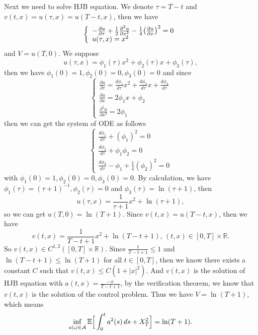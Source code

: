 \documentclass[12pt,a4paper]{ctexart}
\begin{document}
Next we need to solve HJB equation. We denote $\tau = T -t$ and $v(t, x) = u(\tau, x) = u(T - t, x)$, then we have
\begin{equation*}
\left\{
             \begin{array}{l}
             - \frac{\partial u}{\partial \tau} + \frac{1}{2} \frac{\partial^{2} u}{\partial x^{2}} - \frac{1}{4} \big{(} \frac{\partial u}{\partial x}\big{)}^{2} = 0 \\
             u(\tau, x) = x^{2}
             \end{array}
\right.
\end{equation*}
and $V = u(T, 0)$. We suppose
\begin{equation*}
    u(\tau, x) = \phi_{1} (\tau) x^{2} +  \phi_{2} (\tau) x + \phi_{3} (\tau),
\end{equation*}
then we have $\phi_{1} (0) = 1, \phi_{2} (0) = 0, \phi_{3} (0) = 0$ and since 
\begin{equation*}
\left\{
    \begin{array}{l}
        \frac{\partial u}{\partial \tau} = \frac{d \phi_{1}}{d \tau} x^{2} + \frac{d \phi_{2}}{d \tau} x + \frac{d \phi_{3}}{d \tau} \\
        \frac{\partial u}{\partial x} = 2 \phi_{1} x + \phi_{2} \\
        \frac{\partial^{2} u}{\partial x^{2}} = 2 \phi_{1}
    \end{array}
\right.
\end{equation*}
then we can get the system of ODE as follows
\begin{equation*}
\left\{
    \begin{array}{l}
        \frac{d \phi_{1}}{d \tau} + (\phi_{1})^{2} = 0 \\
        \frac{d \phi_{2}}{d \tau} + \phi_{1} \phi_{2} = 0 \\
        \frac{d \phi_{3}}{d \tau} - \phi_{1} + \frac{1}{4} (\phi_{2})^{2} = 0
    \end{array}
\right.
\end{equation*}
with $\phi_{1} (0) = 1, \phi_{2} (0) = 0, \phi_{3} (0) = 0$. By calculation, we have $\phi_{1} (\tau) = (\tau + 1)^{-1}, \phi_{2} (\tau) = 0$ and $\phi_{3} (\tau) = \ln (\tau + 1)$, then
\begin{equation*}
    u(\tau, x) = \frac{1}{\tau + 1} x^{2} + \ln (\tau + 1),
\end{equation*}
so we can get $u(T, 0) = \ln (T + 1)$. Since $v(t, x) = u(T-t, x)$, then we have
\begin{equation*}
    v(t, x) = \frac{1}{T-t+1} x^{2} + \ln (T-t+1), \, (t, x) \in [0, T] \times \mathbb{R}.
\end{equation*}
So $v(t,x) \in C^{1,2} ([0, T] \times \mathbb{R})$. Since $\frac{1}{T-t+1} \leq 1$ and $\ln (T-t+1) \leq \ln(T+1)$ for all $t \in [0, T]$, then we know there exists a constant $C$ such that $v(t, x) \leq C(1+|x|^{2})$. And $v(t,x)$ is the solution of HJB equation with $a(t, x) = \frac{-x}{T-t+1}$, by the verification theorem, we know that $v(t,x)$ is the solution of the control problem. Thus we have $V = \ln (T + 1)$, which means 
\begin{equation*}
 \inf_{a(\centerdot) \in \mathcal{A}} \mathbb{E} \Big{[} \int_{0}^{t} a^{2} (s) \, d s + X_{T}^{2} \Big{]} = \ln (T + 1).
\end{equation*}
\end{document}
